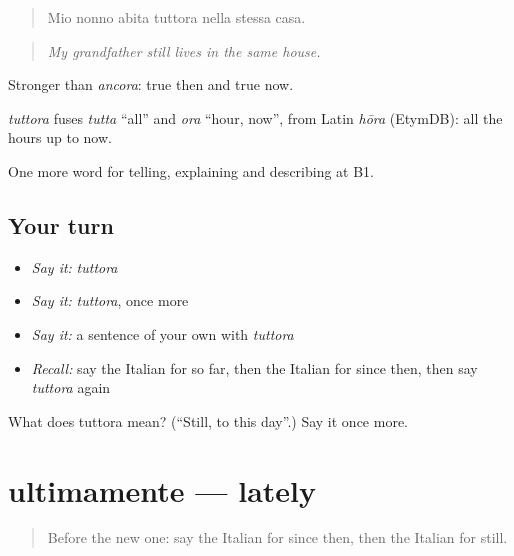 \begin{quote}
Mio nonno abita tuttora nella stessa casa.
\end{quote}

\begin{quote}
\emph{My grandfather still lives in the same house.}
\end{quote}

Stronger than \emph{ancora}: true then and true now.

\begin{cousinweb}
\emph{tuttora} fuses \emph{tutta} \textquotedblleft{}all\textquotedblright{} and \emph{ora} \textquotedblleft{}hour, now\textquotedblright{}, from Latin \emph{hōra} (EtymDB): all the hours up to now.
\end{cousinweb}

\begin{grammarlens}[title={What you've built}]
One more word for telling, explaining and describing at B1.
\end{grammarlens}

\subsection*{Your turn}
\begin{itemize}
\raggedright
  \item \emph{Say it:} \emph{tuttora}
  \item \emph{Say it:} \emph{tuttora}, once more
  \item \emph{Say it:} a sentence of your own with \emph{tuttora}
  \item \emph{Recall:} say the Italian for so far, then the Italian for since then, then say \emph{tuttora} again
\end{itemize}

\begin{tcolorbox}[breakable,colback=teal!4,colframe=teal!35!black,title={Before you move on}]
What does tuttora mean? (\textquotedblleft{}Still, to this day\textquotedblright{}.) Say it once more.
\end{tcolorbox}
\section[ultimamente]{ultimamente — lately}

\label{lesson:IT-C280-ultimamente}



\begin{quote}
Before the new one: say the Italian for since then, then the Italian for still.
\end{quote}

